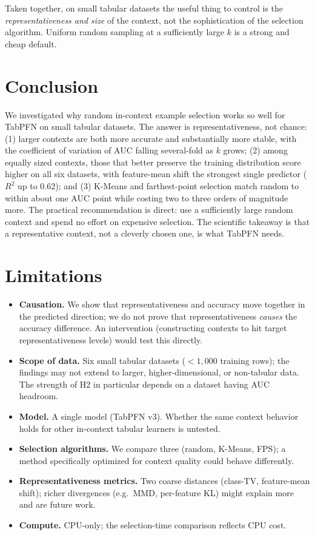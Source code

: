 \documentclass[11pt,a4paper]{article}
\begin{document}
Taken together, on small tabular datasets the useful thing to control is the
\emph{representativeness and size} of the context, not the sophistication of the
selection algorithm. Uniform random sampling at a sufficiently large $k$ is a
strong and cheap default.

\section{Conclusion}

We investigated why random in-context example selection works so well for
TabPFN on small tabular datasets. The answer is representativeness, not chance:
(1) larger contexts are both more accurate and substantially more stable, with
the coefficient of variation of AUC falling several-fold as $k$ grows;
(2) among equally sized contexts, those that better preserve the training
distribution score higher on all six datasets, with feature-mean shift the
strongest single predictor ($R^2$ up to 0.62); and (3) K-Means and
farthest-point selection match random to within about one AUC point while
costing two to three orders of magnitude more. The practical recommendation is
direct: use a sufficiently large random context and spend no effort on expensive
selection. The scientific takeaway is that a representative context, not a
cleverly chosen one, is what TabPFN needs.

\section{Limitations}

\begin{itemize}
\item \textbf{Causation.} We show that representativeness and accuracy move
together in the predicted direction; we do not prove that representativeness
\emph{causes} the accuracy difference. An intervention (constructing contexts to
hit target representativeness levels) would test this directly.
\item \textbf{Scope of data.} Six small tabular datasets ($<1{,}000$ training
rows); the findings may not extend to larger, higher-dimensional, or non-tabular
data. The strength of H2 in particular depends on a dataset having AUC headroom.
\item \textbf{Model.} A single model (TabPFN v3). Whether the same context
behavior holds for other in-context tabular learners is untested.
\item \textbf{Selection algorithms.} We compare three (random, K-Means, FPS); a
method specifically optimized for context quality could behave differently.
\item \textbf{Representativeness metrics.} Two coarse distances (class-TV,
feature-mean shift); richer divergences (e.g.\ MMD, per-feature KL) might explain
more and are future work.
\item \textbf{Compute.} CPU-only; the selection-time comparison reflects CPU
cost.
\end{itemize}
\end{document}
